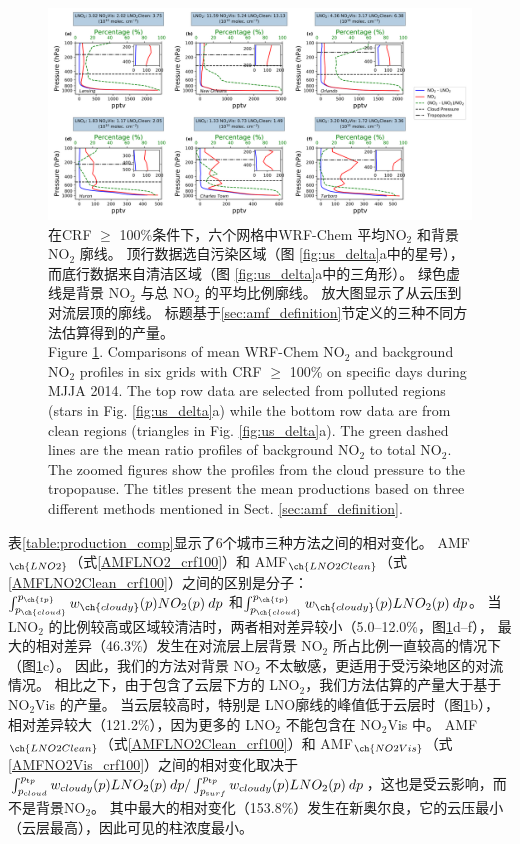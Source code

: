 \begin{figure}[!htbp]
\includegraphics[width=16cm]{./figures/us_bkgd_comp.png}
\caption{在CRF $\geq$ 100\%条件下，六个网格中WRF-Chem 平均NO$_\textrm{2}$ 和背景 NO$_\textrm{2}$ 廓线。
顶行数据选自污染区域（图 \ref{fig:us_delta}a中的星号），而底行数据来自清洁区域（图 \ref{fig:us_delta}a中的三角形）。
绿色虚线是背景 NO$_\textrm{2}$ 与总 NO$_\textrm{2}$ 的平均比例廓线。
放大图显示了从云压到对流层顶的廓线。
标题基于\ref{sec:amf_definition}节定义的三种不同方法估算得到的产量。\\
Figure \ref{fig:us_bkgd_comp}. Comparisons of mean WRF-Chem NO$_\textrm{2}$ and background NO$_\textrm{2}$ profiles in six grids with CRF $\geq$ 100\% on specific days during MJJA 2014.
The top row data are selected from polluted regions (stars in Fig. \ref{fig:us_delta}a) while the bottom row data are from clean regions (triangles in Fig. \ref{fig:us_delta}a).
The green dashed lines are the mean ratio profiles of background NO$_\textrm{2}$ to total NO$_\textrm{2}$.
The zoomed figures show the profiles from the cloud pressure to the tropopause.
The titles present the mean productions based on three different methods mentioned in Sect. \ref{sec:amf_definition}.}
\label{fig:us_bkgd_comp}
\end{figure}


表\ref{table:production_comp}显示了6个城市三种方法之间的相对变化。
AMF$_{\ch{LNO2}}$（式\ref{AMFLNO2_crf100}）和 AMF$_{\ch{LNO2Clean}}$（式\ref{AMFLNO2Clean_crf100}）之间的区别是分子：
$\int_{p_{\ch{cloud}}}^{p_{\ch{tp}}} w_{\ch{cloudy}}(p) NO_2(p) \: dp$
和$\int_{p_{\ch{cloud}}}^{p_{\ch{tp}}} w_{\ch{cloudy}}(p) LNO_2(p) \: dp$。
当 LNO$_2$ 的比例较高或区域较清洁时，两者相对差异较小（5.0--12.0\%，图\ref{fig:us_bkgd_comp}d--f），
最大的相对差异（46.3\%）发生在对流层上层背景 NO$_2$ 所占比例一直较高的情况下（图\ref{fig:us_bkgd_comp}c）。
因此，我们的方法对背景 NO$_2$ 不太敏感，更适用于受污染地区的对流情况。
相比之下，由于包含了云层下方的 LNO$_2$，我们方法估算的产量大于基于 NO$_2$Vis 的产量。
当云层较高时，特别是 LNO廓线的峰值低于云层时（图\ref{fig:us_bkgd_comp}b），
相对差异较大（121.2\%），因为更多的 LNO$_2$ 不能包含在 NO$_2$Vis 中。
AMF$_{\ch{LNO2Clean}}$（式\ref{AMFLNO2Clean_crf100}）和 AMF$_{\ch{NO2Vis}}$（式\ref{AMFNO2Vis_crf100}）之间的相对变化取决于
$\int_{p_{\textrm cloud}}^{p_{\textrm tp}} w_{\textrm cloudy}(p) LNO_2(p) \: dp / \int_{p_{\textrm surf}}^{p_{\textrm tp}} w_{\textrm cloudy}(p) LNO_2(p) \: dp$，这也是受云影响，而不是背景NO$_2$。
其中最大的相对变化（153.8\%）发生在新奥尔良，它的云压最小（云层最高），因此可见的柱浓度最小。

